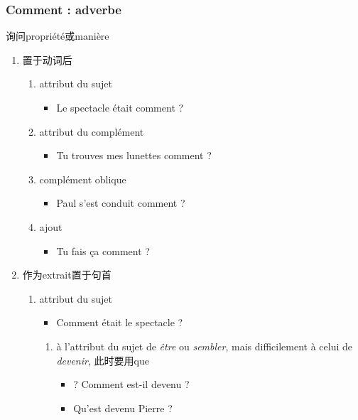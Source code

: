 \documentclass[UTF8]{report}
\begin{document}
\subsubsection{Comment : adverbe}
询问propriété或manière
\begin{enumerate}
    \item 置于动词后
    \begin{enumerate}
        \item attribut du sujet
        \begin{itemize}
            \item Le spectacle était comment ?
        \end{itemize}
        \item attribut du complément
        \begin{itemize}
            \item Tu trouves mes lunettes comment ?
        \end{itemize}
        \item complément oblique
        \begin{itemize}
            \item Paul s’est conduit comment ?
        \end{itemize}
        \item ajout
        \begin{itemize}
            \item Tu fais ça comment ?
        \end{itemize}
    \end{enumerate}
    \item 作为extrait置于句首
    \begin{enumerate}
        \item attribut du sujet
        \begin{itemize}
            \item Comment était le spectacle ?
        \end{itemize}
        \begin{enumerate}
            \item à l’attribut du sujet de \textit{être} ou \textit{sembler}, mais difficilement à celui de \textit{devenir}, 此时要用que
            \begin{itemize}
                \item ? Comment est-il devenu ?
                \item Qu’est devenu Pierre ?
            \end{itemize}
        \end{enumerate}

\end{enumerate}
\end{enumerate}
\end{document}
